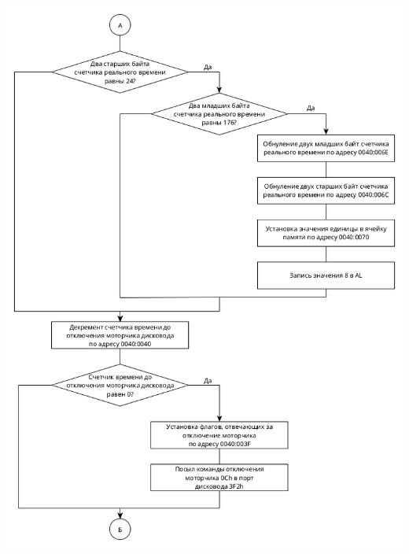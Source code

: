 \documentclass[14pt, a4paper]{article}
\begin{document}
	\begin{minipage}{0.9\linewidth}
		\includegraphics[width=\linewidth]{diagram1_2}
	\end{minipage}

	\pagebreak
	
\end{document}
